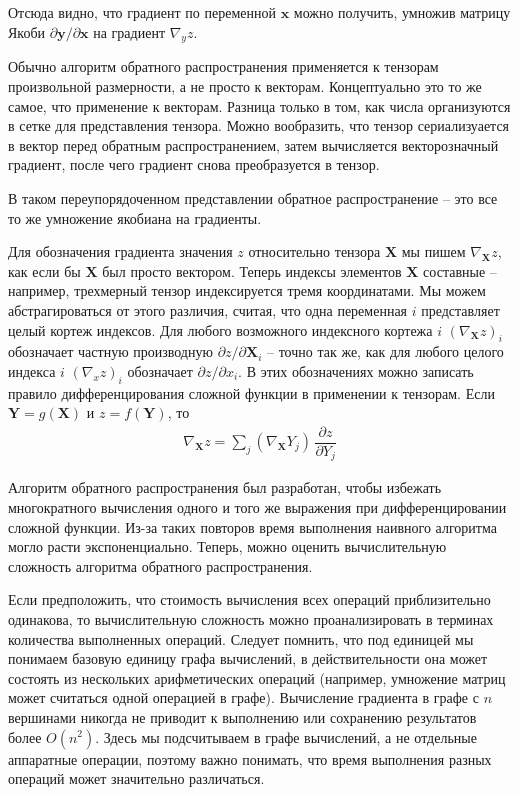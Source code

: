 \documentclass[%
	11pt,
	a4paper,
	utf8,
]{article}
\begin{document}
Отсюда видно, что градиент по переменной $ \mathbf{x} $ можно получить, умножив матрицу Якоби $ \partial \mathbf{y} / \partial \mathbf{x} $ на градиент $ \nabla_y z $.

Обычно алгоритм обратного распространения применяется к тензорам произвольной размерности, а не просто к векторам. Концептуально это то же самое, что применение к векторам. Разница только в том, как числа организуются в сетке для представления тензора. Можно вообразить, что тензор сериализуается в вектор перед обратным распространением, затем вычисляется векторозначный градиент, после чего градиент снова преобразуется в тензор.

В таком переупорядоченном представлении обратное распространение -- это все то же умножение якобиана на градиенты.

Для обозначения градиента значения $ z $ относительно тензора $ \mathbf{X} $ мы пишем $ \nabla_\mathbf{X} z $, как если бы $ \mathbf{X} $ был просто вектором. Теперь индексы элементов $ \mathbf{X} $ составные -- например, трехмерный тензор индексируется тремя координатами. Мы можем абстрагироваться от этого различия, считая, что одна переменная $ i $ представляет целый кортеж индексов. Для любого возможного индексного кортежа
$ i $ $ (\nabla_\mathbf{X} z)_i $ обозначает частную производную $ \partial z / \partial \mathbf{X}_i $ -- точно так же, как для любого целого индекса $ i $ $ (\nabla_x z)_i$ обозначает $ \partial z / \partial x_i $. В этих обозначениях можно записать правило дифференцирования сложной функции в применении к тензорам. Если $ \mathbf{Y} = g(\mathbf{X}) $ и $ z = f(\mathbf{Y}) $, то
\begin{align*}
	\nabla_\mathbf{X} z = \sum_j (\nabla_\mathbf{X} Y_j) \, \dfrac{\partial z}{ \partial Y_j }
\end{align*}

Алгоритм обратного распространения был разработан, чтобы избежать многократного вычисления одного и того же выражения при дифференцировании сложной функции. Из-за таких повторов время выполнения наивного алгоритма могло расти экспоненциально. Теперь, можно оценить вычислительную сложность алгоритма обратного распространения.

Если предположить, что стоимость вычисления всех операций приблизительно одинакова, то вычислительную сложность можно проанализировать в терминах количества выполненных операций. Следует помнить, что под единицей мы понимаем базовую единицу графа вычислений, в действительности она может состоять из нескольких арифметических операций (например, умножение матриц может считаться одной операцией в графе). Вычисление градиента в графе с $ n $ вершинами никогда не приводит к выполнению или сохранению результатов более $ O(n^2) $. Здесь мы подсчитываем в графе вычислений, а не отдельные аппаратные операции, поэтому важно понимать, что время выполнения разных операций может значительно различаться. 
\end{document}
